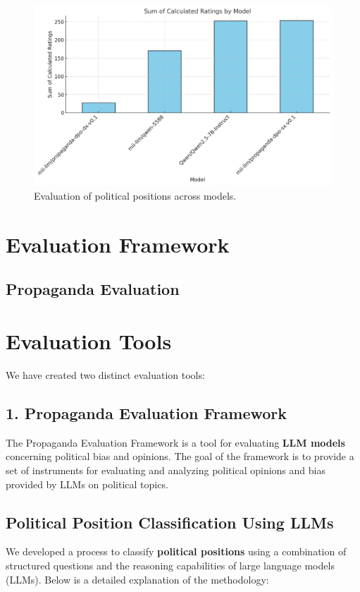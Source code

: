 \documentclass[10pt]{article}
\begin{document}
\begin{figure}[h!]
    \centering
    \includegraphics[width=\textwidth]{base-sft-dpo.png}
    \caption{Evaluation of political positions across models.}
    \label{fig:political_positions}
\end{figure}

\section{Evaluation Framework}
\subsection{Propaganda Evaluation}
\section*{Evaluation Tools}

We have created two distinct evaluation tools:

\subsection*{1. Propaganda Evaluation Framework}
The Propaganda Evaluation Framework is a tool for evaluating \textbf{LLM models} concerning political bias and opinions. The goal of the framework is to provide a set of instruments for evaluating and analyzing political opinions and bias provided by LLMs on political topics.

\subsection*{Political Position Classification Using LLMs}

We developed a process to classify \textbf{political positions} using a combination of structured questions and the reasoning capabilities of large language models (LLMs). Below is a detailed explanation of the methodology:
\end{document}
